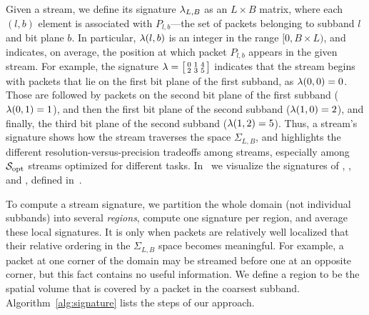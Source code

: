 


Given a stream, we define its signature $\sgn_{L,B}$ as an $L \times B$ matrix, where each $(l,b)$
element is associated with $P_{l,b}$---the set of packets belonging to subband $l$ and bit plane
$b$. In particular, $\sgn(l,b)$ is an integer in the range $[0, B\times L)$, and indicates, on
average, the position at which packet $P_{l,b}$ appears in the given stream. For example, the
signature $\sgn=\bigl[ \begin{smallmatrix}0 & 1 & 4\\ 2 & 3 & 5\end{smallmatrix}\bigr]$ indicates
that the stream begins with packets that lie on the first bit plane of the first subband, as
$\sgn(0,0)=0$. Those are followed by packets on the second bit plane of the first subband
($\sgn(0,1)=1$), and then the first bit plane of the second subband ($\sgn(1,0)=2$), and finally,
the third bit plane of the second subband ($\sgn(1,2)=5$). Thus, a stream's signature shows how the
stream traverses the space $\Sigma_{L,B}$, and highlights the different resolution-versus-precision
tradeoffs among streams, especially among $\sopt$ streams optimized for different tasks.
In~ we visualize the signatures of \sbit, \slvl, and \swav, defined
in~.

To compute a stream signature, we partition the whole domain (not individual subbands) into several
\emph{regions}, compute one signature per region, and average these local signatures. It is only
when packets are relatively well localized that their relative ordering in the $\Sigma_{L,B}$ space
becomes meaningful. For example, a packet at one corner of the domain may be streamed before one at
an opposite corner, but this fact contains no useful information. We define a region to be the
spatial volume that is covered by a packet in the coarsest subband. Algorithm~\ref{alg:signature}
lists the steps of our approach.


